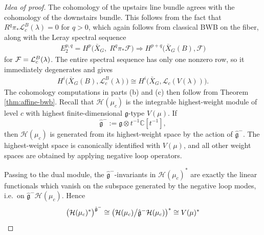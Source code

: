 \documentclass[12pt]{article}
\begin{document}
\begin{proof}
    [Idea of proof] The cohomology of the upstairs line bundle agrees with the cohomology of the downstairs bundle. This follows from the fact that $R^q\pi_*\mathcal L_c^B(\lambda)=0 $ for $q>0$, which again follows from classical BWB on the fiber, along with the Leray spectral sequence \begin{align*}
        E_2^{p,q}
=
H^p\bigl(\bar X_G,\; R^q\pi_*\mathcal F\bigr)
\Longrightarrow
H^{p+q}\bigl(\bar X_G(B),\mathcal F\bigr)
    \end{align*} for ${\mathcal{F}} = \mathcal L_c^B(\lambda)$. The entire spectral sequence has only one nonzero row, so it immediately degenerates and gives \begin{align*}
        H^i\bigl(\bar X_G(B),\mathcal L_c^B(\lambda)\bigr)
\cong
H^i\bigl(\bar X_G,\mathcal L_c(V(\lambda))\bigr).
    \end{align*}
The cohomology computations in parts (b) and (c) then follow from Theorem \ref{thm:affine-bwb}. Recall that \(\mathcal H(\mu_c)\) is the integrable highest-weight module of level \(c\) with highest finite-dimensional \(\mathfrak g\)-type \(V(\mu)\). If
\[
\hat{\mathfrak g}^{-}:=\mathfrak g\otimes t^{-1}\mathbb C[t^{-1}],
\]
then \(\mathcal H(\mu_c)\) is generated from its highest-weight space by the action of \(\hat{\mathfrak g}^{-}\). The highest-weight space is canonically identified with \(V(\mu)\), and all other weight spaces are obtained by applying negative loop operators.

Passing to the dual module, the \(\hat{\mathfrak g}^{-}\)-invariants in \(\mathcal H(\mu_c)^*\) are exactly the linear functionals which vanish on the subspace generated by the negative loop modes, i.e.\ on \(\hat{\mathfrak g}^{-}\mathcal H(\mu_c)\). Hence
\[
\bigl(\mathcal H(\mu_c)^*\bigr)^{\hat{\mathfrak g}^{-}}
\cong
\left(\mathcal H(\mu_c)\big/\hat{\mathfrak g}^{-}\mathcal H(\mu_c)\right)^*
\cong
V(\mu)^* \qedhere
\]
\end{proof}
\end{document}
